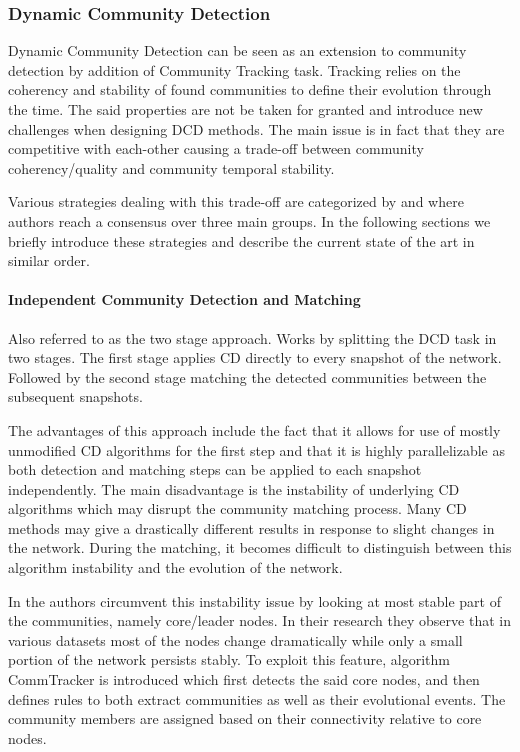 \documentclass[
acmsmall,
nonacm,
screen,
acmthm]{../../scripts/pandoc/templates/acmart}
\begin{document}
\hypertarget{dynamic-community-detection}{%
\subsubsection{Dynamic Community
Detection}\label{dynamic-community-detection}}

Dynamic Community Detection can be seen as an extension to community
detection by addition of Community Tracking task. Tracking relies on the
coherency and stability of found communities to define their evolution
through the time. The said properties are not be taken for granted and
introduce new challenges when designing DCD methods. The main issue is
in fact that they are competitive with each-other causing a trade-off
between community coherency/quality and community temporal stability.

Various strategies dealing with this trade-off are categorized by
\citet{rossettiCommunityDiscoveryDynamic2018} and
\citet{dakicheTrackingCommunityEvolution2019} where authors reach a
consensus over three main groups. In the following sections we briefly
introduce these strategies and describe the current state of the art in
similar order.

\hypertarget{independent-community-detection-and-matching}{%
\paragraph{Independent Community Detection and
Matching}\label{independent-community-detection-and-matching}}

Also referred to as the two stage approach. Works by splitting the DCD
task in two stages. The first stage applies CD directly to every
snapshot of the network. Followed by the second stage matching the
detected communities between the subsequent snapshots.

The advantages of this approach include the fact that it allows for use
of mostly unmodified CD algorithms for the first step and that it is
highly parallelizable as both detection and matching steps can be
applied to each snapshot independently. The main disadvantage is the
instability of underlying CD algorithms which may disrupt the community
matching process. Many CD methods may give a drastically different
results in response to slight changes in the network. During the
matching, it becomes difficult to distinguish between this algorithm
instability and the evolution of the network.

In \citet{wangCommunityEvolutionSocial2008} the authors circumvent this
instability issue by looking at most stable part of the communities,
namely core/leader nodes. In their research they observe that in various
datasets most of the nodes change dramatically while only a small
portion of the network persists stably. To exploit this feature,
algorithm CommTracker is introduced which first detects the said core
nodes, and then defines rules to both extract communities as well as
their evolutional events. The community members are assigned based on
their connectivity relative to core nodes.
\end{document}
